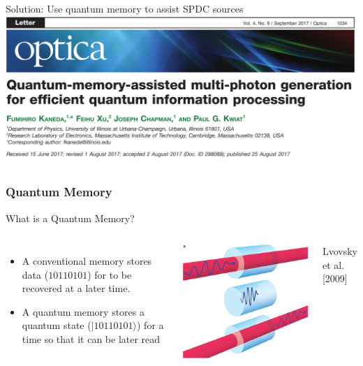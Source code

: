 \documentclass{beamer}
\begin{document}
\begin{frame}{Solution: Use quantum memory to assist SPDC sources}
    \includegraphics[width=1.0\textwidth]{Images/PaperTitle.png}
\end{frame}

\begin{frame}\frametitle{Quantum Memory}
    \begin{block}{What is a Quantum Memory?}
        \begin{columns}
            \begin{itemize}
                \item A conventional memory stores data ($10110101$) for to be recovered at a later time.
                \item A quantum memory stores a quantum state ($|10110101\rangle$) for a time so that it can be later read
            \end{itemize}
            \centering
            \includegraphics[width=1.0\textwidth]{Images/QuantMem.jpg}

            \tiny{Lvovsky et al. [2009]}
        \end{columns}
    \end{block}
\end{frame}
\end{document}
